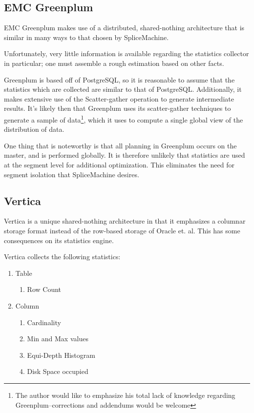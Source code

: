 \subsection{EMC Greenplum}
EMC Greenplum makes use of a distributed, shared-nothing architecture that is similar in many ways to that chosen by SpliceMachine.

Unfortunately, very little information is available regarding the statistics collector in particular; one must assemble a rough estimation based on other facts.

Greenplum is based off of PostgreSQL, so it is reasonable to assume that the statistics which are collected are similar to that of PostgreSQL. Additionally, it makes extensive use of the Scatter-gather operation to generate intermediate results\cite{GreenplumAdmin}. It's likely then that Greenplum uses its scatter-gather techniques to generate a sample of data\footnote{The author would like to emphasize his total lack of knowledge regarding Greenplum--corrections and addendums would be welcome}, which it uses to compute a single global view of the distribution of data.

One thing that is noteworthy is that all planning in Greenplum occurs on the master, and is performed globally\cite{GreenplumAdmin}. It is therefore unlikely that statistics are used at the segment level for additional optimization. This eliminates the need for segment isolation that SpliceMachine desires.

\subsection{Vertica}
Vertica is a unique shared-nothing architecture in that it emphasizes a columnar storage format instead of the row-based storage of Oracle et. al. This has some consequences on its statistics engine.

Vertica collects the following statistics\cite{Vertica}:

\begin{enumerate}
				\item Table
								\begin{enumerate}
												\item	Row Count
								\end{enumerate}
				\item Column
								\begin{enumerate}
												\item	Cardinality
												\item Min and Max values
												\item Equi-Depth Histogram
												\item Disk Space occupied
								\end{enumerate}
\end{enumerate}

